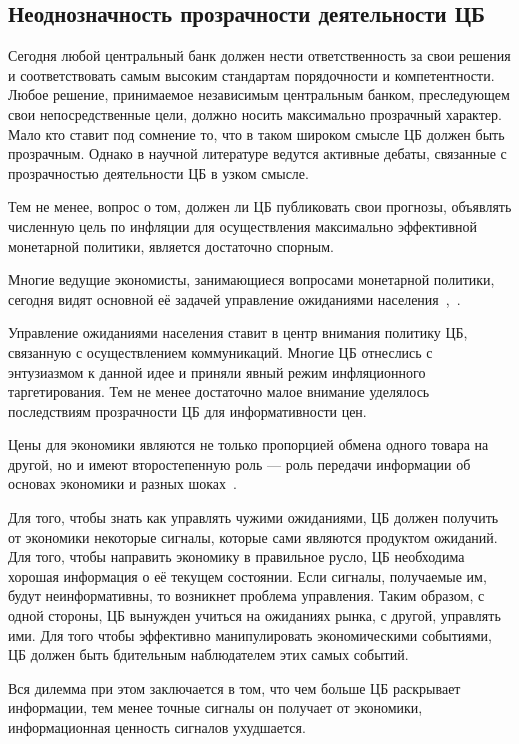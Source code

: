 \documentclass[14pt,a4paper, oneside]{extreport}
\theoremstyle{plain}              %
\theoremstyle{definition}         %
\begin{document}
\subsection{Неоднозначность прозрачности деятельности ЦБ}

Сегодня любой центральный банк должен нести ответственность за свои решения и соответствовать самым высоким стандартам порядочности и компетентности. Любое решение, принимаемое независимым центральным банком, преследующем свои непосредственные цели, должно носить максимально прозрачный характер. Мало кто ставит под сомнение то, что в таком широком смысле ЦБ должен быть прозрачным. Однако в научной литературе ведутся активные дебаты, связанные с прозрачностью деятельности ЦБ в узком смысле. 

Тем не менее, вопрос о том, должен ли ЦБ публиковать свои прогнозы, объявлять численную цель по инфляции для осуществления максимально эффективной монетарной политики, является достаточно спорным.

Многие ведущие экономисты, занимающиеся вопросами монетарной политики, сегодня видят основной её задачей управление ожиданиями населения~\cite{svensson2000should},~\cite{woodford2005central}.

Управление ожиданиями населения ставит в центр внимания политику ЦБ, связанную с осуществлением коммуникаций. Многие ЦБ отнеслись с энтузиазмом к данной идее и приняли явный режим инфляционного таргетирования. Тем не менее достаточно малое внимание уделялось последствиям прозрачности ЦБ для информативности цен.

Цены для экономики являются не только пропорцией обмена одного товара на другой, но и имеют второстепенную роль --- роль передачи информации об основах экономики и разных шоках~\cite{hayek1945use}.

 Для того, чтобы знать как управлять чужими ожиданиями, ЦБ должен получить от экономики некоторые сигналы, которые сами являются продуктом ожиданий. Для того, чтобы направить экономику в правильное русло, ЦБ необходима хорошая информация о её текущем состоянии. Если сигналы, получаемые им, будут неинформативны, то возникнет проблема управления. Таким образом, с одной стороны, ЦБ вынужден учиться на ожиданиях рынка, с другой, управлять ими. Для того чтобы эффективно манипулировать экономическими событиями, ЦБ должен быть бдительным наблюдателем этих самых событий. 
 
Вся дилемма при этом заключается в том, что чем больше ЦБ раскрывает информации, тем менее точные сигналы он получает от экономики, информационная ценность сигналов ухудшается. 
 
\end{document}
